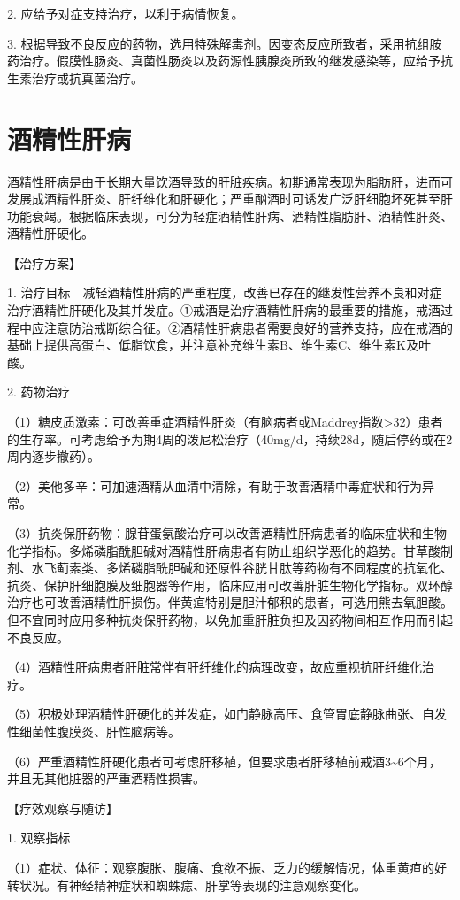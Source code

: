 2. 应给予对症支持治疗，以利于病情恢复。

3.
根据导致不良反应的药物，选用特殊解毒剂。因变态反应所致者，采用抗组胺药治疗。假膜性肠炎、真菌性肠炎以及药源性胰腺炎所致的继发感染等，应给予抗生素治疗或抗真菌治疗。

\section{酒精性肝病}

酒精性肝病是由于长期大量饮酒导致的肝脏疾病。初期通常表现为脂肪肝，进而可发展成酒精性肝炎、肝纤维化和肝硬化；严重酗酒时可诱发广泛肝细胞坏死甚至肝功能衰竭。根据临床表现，可分为轻症酒精性肝病、酒精性脂肪肝、酒精性肝炎、酒精性肝硬化。

【治疗方案】

1.
治疗目标　减轻酒精性肝病的严重程度，改善已存在的继发性营养不良和对症治疗酒精性肝硬化及其并发症。①戒酒是治疗酒精性肝病的最重要的措施，戒酒过程中应注意防治戒断综合征。②酒精性肝病患者需要良好的营养支持，应在戒酒的基础上提供高蛋白、低脂饮食，并注意补充维生素B、维生素C、维生素K及叶酸。

2. 药物治疗

（1）糖皮质激素：可改善重症酒精性肝炎（有脑病者或Maddrey指数\textgreater{}32）患者的生存率。可考虑给予为期4周的泼尼松治疗（40mg/d，持续28d，随后停药或在2周内逐步撤药）。

（2）美他多辛：可加速酒精从血清中清除，有助于改善酒精中毒症状和行为异常。

（3）抗炎保肝药物：腺苷蛋氨酸治疗可以改善酒精性肝病患者的临床症状和生物化学指标。多烯磷脂酰胆碱对酒精性肝病患者有防止组织学恶化的趋势。甘草酸制剂、水飞蓟素类、多烯磷脂酰胆碱和还原性谷胱甘肽等药物有不同程度的抗氧化、抗炎、保护肝细胞膜及细胞器等作用，临床应用可改善肝脏生物化学指标。双环醇治疗也可改善酒精性肝损伤。伴黄疸特别是胆汁郁积的患者，可选用熊去氧胆酸。但不宜同时应用多种抗炎保肝药物，以免加重肝脏负担及因药物间相互作用而引起不良反应。

（4）酒精性肝病患者肝脏常伴有肝纤维化的病理改变，故应重视抗肝纤维化治疗。

（5）积极处理酒精性肝硬化的并发症，如门静脉高压、食管胃底静脉曲张、自发性细菌性腹膜炎、肝性脑病等。

（6）严重酒精性肝硬化患者可考虑肝移植，但要求患者肝移植前戒酒3\textasciitilde{}6个月，并且无其他脏器的严重酒精性损害。

【疗效观察与随访】

1. 观察指标

（1）症状、体征：观察腹胀、腹痛、食欲不振、乏力的缓解情况，体重黄疸的好转状况。有神经精神症状和蜘蛛痣、肝掌等表现的注意观察变化。

